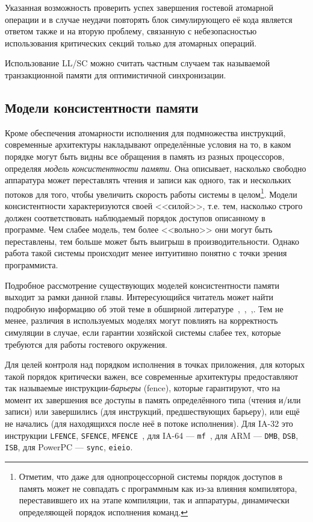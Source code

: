 Указанная возможность проверить успех завершения гостевой атомарной операции и в случае неудачи повторять блок симулирующего её кода является ответом также и на вторую проблему, связанную с небезопасностью использования критических секций только для атомарных операций.

Использование LL/SC можно считать частным случаем так называемой транзакционной памяти для оптимистичной синхронизации. %

\subsection{Модели консистентности памяти}

Кроме обеспечения атомарности исполнения для подмножества инструкций, современные архитектуры накладывают определённые условия на то, в каком порядке могут быть видны все обращения в память из разных процессоров, определяя \textit{модель консистентности памяти}. Она описывает, насколько свободно аппаратура может переставлять чтения и записи как одного, так и нескольких потоков для того, чтобы увеличить скорость работы системы в целом\footnote{Отметим, что даже для однопроцессорной системы порядок доступов в память может не совпадать с программным как из-за влияния компилятора, переставившего их на этапе компиляции, так и аппаратуры, динамически определяющей порядок исполнения команд.}. Модели консистентности характеризуются своей <<силой>>, т.е. тем, насколько строго должен соответствовать наблюдаемый порядок доступов описанному в программе. Чем слабее модель, тем более <<вольно>> они могут быть переставлены, тем больше может быть выигрыш в производительности. Однако работа такой системы происходит менее интуитивно понятно с точки зрения программиста.

Подробное рассмотрение существующих моделей консистентности памяти выходит за рамки данной главы. Интересующийся читатель может найти подробную информацию об этой теме в обширной литературе~\cite{Adve96sharedmemory},~\cite{Mosberger93memoryconsistency},~\cite[глава 9 и приложение A.7]{DBLP:books/daglib/0013597},\cite{whymb}. Тем не менее, различия в используемых моделях могут повлиять на корректность симуляции в случае, если гарантии хозяйской системы слабее тех, которые требуются для работы гостевого окружения. 

Для целей контроля над порядком исполнения в точках приложения, для которых такой порядок критически важен, все современные архитектуры предоставляют так называемые инструкции-\textit{барьеры} (\abbr fence), которые гарантируют, что на момент их завершения все доступы в память определённого типа (чтения и/или записи) или завершились (для инструкций, предшествующих барьеру), или ещё не начались (для находящихся после неё в потоке исполнения). Для IA-32 это инструкции \texttt{LFENCE}, \texttt{SFENCE}, \texttt{MFENCE}~\cite{intel-64-memory-ordering}, для IA-64 — \texttt{mf}~\cite{itanium-mem-order}, для ARM — \texttt{DMB}, \texttt{DSB}, \texttt{ISB}, для PowerPC — \texttt{sync}, \texttt{eieio}.

